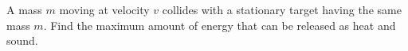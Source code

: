 A mass $m$ moving at velocity $v$ collides with a stationary target having the same
mass $m$. Find the maximum amount of energy that can be released as heat and sound.
\answercheck
